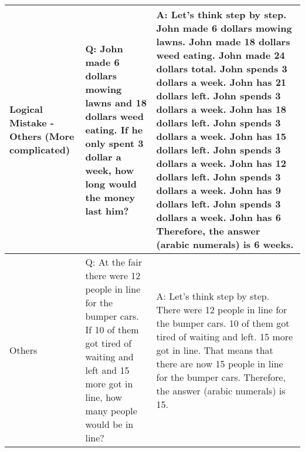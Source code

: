 \begin{center}
\begin{longtable}{|p{}|p{}|p{}|}
\midrule

Logical Mistake - Others (More complicated) &Q: John made 6 dollars mowing lawns and 18 dollars weed eating. If he only spent 3 dollar a week, how long would the money last him? &A: Let's think step by step. John made 6 dollars mowing lawns. John made 18 dollars weed eating. John made 24 dollars total. John spends 3 dollars a week. John has 21 dollars left. John spends 3 dollars a week. John has 18 dollars left. John spends 3 dollars a week. John has 15 dollars left. John spends 3 dollars a week. John has 12 dollars left. John spends 3 dollars a week. John has 9 dollars left. John spends 3 dollars a week. John has 6 Therefore, the answer (arabic numerals) is 6 weeks. \\

\midrule

Others &Q: At the fair there were 12 people in line for the bumper cars. If 10 of them got tired of waiting and left and 15 more got in line, how many people would be in line? &A: Let's think step by step. There were 12 people in line for the bumper cars. 10 of them got tired of waiting and left. 15 more got in line. That means that there are now 15 people in line for the bumper cars. Therefore, the answer (arabic numerals) is 15. \\

\bottomrule

\end{longtable}
\end{center}